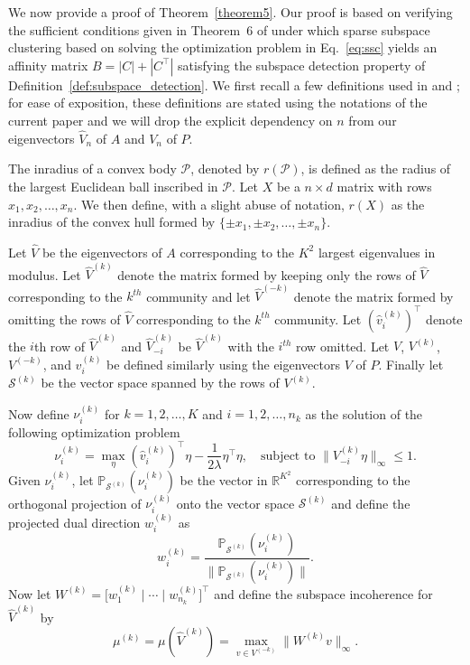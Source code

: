 \documentclass[12pt]{article}
\begin{document}

We now provide a proof of Theorem~\ref{theorem5}. Our proof is based
on verifying the sufficient conditions given in Theorem~6 of
\citet{jmlr-v28-wang13}
under which sparse subspace clustering based on solving the
optimization problem in Eq.~\eqref{eq:ssc} yields an affinity matrix
$B = |C| + |C^{\top}|$ satisfying the subspace detection property of
Definition~\ref{def:subspace_detection}. We first recall a few
definitions used in \citet{soltanolkotabi2012} and \citet{jmlr-v28-wang13}; for ease of exposition,
these definitions are stated using the notations of the current
paper and we will drop the explicit dependency on $n$ from our
eigenvectors $\hat{V}_n$ of $A$ and $V_n$ of $P$.
\begin{definition}[Inradius]
  \label{inradius}
The inradius of a convex body $\mathcal{P}$, denoted by $r(\mathcal{P})$, is
defined as the radius of the largest Euclidean ball inscribed in $\mathcal{P}$.
Let $X$ be a $n \times d$ matrix with rows $x_1, x_2, \dots,
x_n$. We then define, with a slight abuse of notation, $r(X)$ as the
inradius of the convex hull formed by $\{\pm x_1, \pm x_2, \dots, \pm x_n\}$. 
\end{definition}

\begin{definition}
  \label{def:subspace_incoherence}
Let $\hat{V}$ be the eigenvectors of $A$
corresponding to the $K^2$ largest eigenvalues in modulus. Let
$\hat{V}^{(k)}$ denote the matrix formed by keeping only the rows of
$\hat{V}$ corresponding to the $k^{th}$
community and let $\hat{V}^{(-k)}$ denote the matrix formed by
omitting the rows of $\hat{V}$
corresponding to the $k^{th}$ community. Let $(\hat{v}_i^{(k)})^\top$ denote
the $i$th row of $\hat{V}^{(k)}$ and $\hat{V}_{-i}^{(k)}$ be $\hat{V}^{(k)}$ with
the $i^{th}$ row omitted. Let $V$, $V^{(k)}$, $V^{(-k)}$, and
$v_i^{(k)}$ be defined similarly using the eigenvectors $V$ of
$P$. Finally let $\mathcal{S}^{(k)}$ be the vector space spanned by the
rows of $V^{(k)}$. 

Now define $\nu_{i}^{(k)}$ for $k = 1,2,\dots,K$ and $i =
1,2,\dots,n_{k}$ as the solution of the following optimization problem
$$\nu_{i}^{(k)} = \max_\eta (\hat{v}_i^{(k)})^\top \eta - \frac{1}{2
  \lambda} \eta^\top \eta, \quad \text{subject to $\|V_{-i}^{(k)}
  \eta\|_\infty \leq 1$.}$$
Given $\nu_i^{(k)}$, let $\mathbb{P}_{\mathcal{S}^{(k)}}(\nu_i^{(k)})$
be the vector in $\mathbb{R}^{K^2}$ corresponding to the orthogonal projection of $\nu_i^{(k)}$ onto the vector space
$\mathcal{S}^{(k)}$ and define the projected dual direction $w_{i}^{(k)}$
as
$$w_i^{(k)} =
\frac{\mathbb{P}_{\mathcal{S}^{(k)}}(\nu_i^{(k)})}{\|\mathbb{P}_{\mathcal{S}^{(k)}}(\nu_i^{(k)})\|}.$$
Now let $W^{(k)} = \bigl[ w_1^{(k)} \mid \cdots \mid w_{n_k}^{(k)} \bigr]^\top$
and define the subspace incoherence for $\hat{V}^{(k)}$ by
$$\mu^{(k)} = \mu(\hat{V}^{(k)}) = \max\limits_{v \in V^{(-k)}} \|W^{(k)} v\|_\infty.$$
\end{definition}
\end{document}
